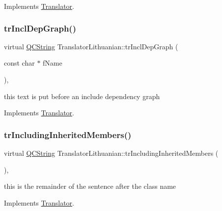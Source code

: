 Implements \mbox{\hyperlink{class_translator}{Translator}}.

\mbox{\label{class_translator_lithuanian_a43a88864a8ee6401235457e761ffe6c5}} 
\subsubsection{\texorpdfstring{trInclDepGraph()}{trInclDepGraph()}}
{\footnotesize\ttfamily virtual \mbox{\hyperlink{class_q_c_string}{Q\+C\+String}} Translator\+Lithuanian\+::tr\+Incl\+Dep\+Graph (\begin{DoxyParamCaption}\item[{const char $\ast$}]{f\+Name }\end{DoxyParamCaption})\hspace{0.3cm}{\ttfamily [inline]}, {\ttfamily [virtual]}}

this text is put before an include dependency graph 

Implements \mbox{\hyperlink{class_translator}{Translator}}.

\mbox{\label{class_translator_lithuanian_a86ac471022e7f54fc71edf3593c355d0}} 
\subsubsection{\texorpdfstring{trIncludingInheritedMembers()}{trIncludingInheritedMembers()}}
{\footnotesize\ttfamily virtual \mbox{\hyperlink{class_q_c_string}{Q\+C\+String}} Translator\+Lithuanian\+::tr\+Including\+Inherited\+Members (\begin{DoxyParamCaption}{ }\end{DoxyParamCaption})\hspace{0.3cm}{\ttfamily [inline]}, {\ttfamily [virtual]}}

this is the remainder of the sentence after the class name 

Implements \mbox{\hyperlink{class_translator}{Translator}}.

\mbox{\label{class_translator_lithuanian_a2f300c866e798e173b0a219bc2d3d261}} 
